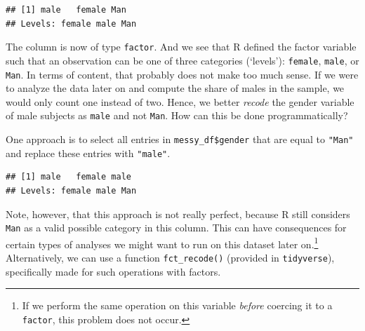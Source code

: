 \documentclass[
  12pt,
]{style/krantz}
\newenvironment{Shaded}{\begin{snugshade}}{\end{snugshade}}
\newcommand{\FunctionTok}[1]{\textcolor[rgb]{0.00,0.00,0.00}{#1}}
\newcommand{\NormalTok}[1]{#1}
\newcommand{\OtherTok}[1]{\textcolor[rgb]{0.56,0.35,0.01}{#1}}
\newcommand{\SpecialCharTok}[1]{\textcolor[rgb]{0.00,0.00,0.00}{#1}}
\newcommand{\StringTok}[1]{\textcolor[rgb]{0.31,0.60,0.02}{#1}}
\begin{document}
\begin{Shaded}
\end{Shaded}

\begin{verbatim}
## [1] male   female Man   
## Levels: female male Man
\end{verbatim}

The column is now of type \texttt{factor}. And we see that R defined the factor variable such that an observation can be one of three categories (`levels'): \texttt{female}, \texttt{male}, or \texttt{Man}. In terms of content, that probably does not make too much sense. If we were to analyze the data later on and compute the share of males in the sample, we would only count one instead of two. Hence, we better \emph{recode} the gender variable of male subjects as \texttt{male} and not \texttt{Man}. How can this be done programmatically?

One approach is to select all entries in \texttt{messy\_df\$gender} that are equal to \texttt{"Man"} and replace these entries with \texttt{"male"}.

\begin{Shaded}
\end{Shaded}

\begin{verbatim}
## [1] male   female male  
## Levels: female male Man
\end{verbatim}

Note, however, that this approach is not really perfect, because R still considers \texttt{Man} as a valid possible category in this column. This can have consequences for certain types of analyses we might want to run on this dataset later on.\footnote{If we perform the same operation on this variable \emph{before} coercing it to a \texttt{factor}, this problem does not occur.} Alternatively, we can use a function \texttt{fct\_recode()} (provided in \texttt{tidyverse}), specifically made for such operations with factors.
\end{document}
